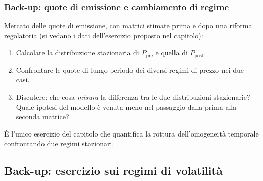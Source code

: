 \documentclass[handout]{beamer}%
\providecommand{\QTR}[2]{\csname #1\endcsname{#2}}
\begin{document}
\begin{frame}%
%

\frametitle{Back-up: quote di emissione e cambiamento di regime}%


Mercato delle quote di emissione, con matrici stimate prima e dopo una riforma
regolatoria (si vedano i dati dell'esercizio proposto nel capitolo):

\medskip

\begin{enumerate}
\item[1.] Calcolare la distribuzione stazionaria di $P_{\mathrm{pre}}$ e
quella di $P_{\mathrm{post}}$.

\item[2.] Confrontare le quote di lungo periodo dei diversi regimi di prezzo
nei due casi.

\item[3.] Discutere: che cosa \emph{misura} la differenza tra le due
distribuzioni stazionarie? Quale ipotesi del modello \`{e} venuta meno nel
passaggio dalla prima alla seconda matrice?
\end{enumerate}

\medskip

\begin{center}
{\small \`{E} l'unico esercizio del capitolo che quantifica la rottura
dell'omogeneit\`{a} temporale confrontando due regimi stazionari.}
\end{center}%

\transboxout
\end{frame}%




\subsection{Back-up: esercizio sui regimi di volatilit\`{a}}%
\end{document}
